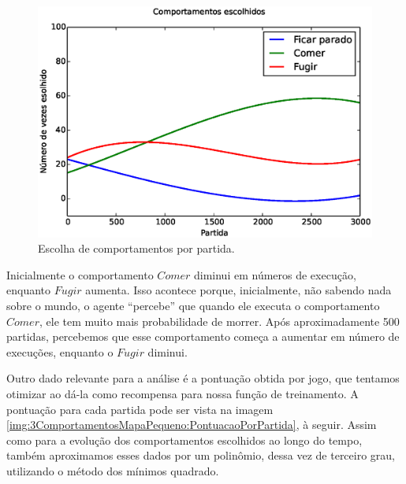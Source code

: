 \begin{figure}[H]
    \centering
    \includegraphics[width=\linewidth]{images/3_behaviors_small_map/chosen_behaviors_pol}
    \caption{Escolha de comportamentos por partida.}
    \label{img:3ComportamentosMapaPequeno:ComportamentosEscolhidosPolinômio}
\end{figure}

Inicialmente o comportamento $ Comer $ diminui em números de execução, enquanto $ Fugir $ aumenta. Isso acontece porque, inicialmente, não sabendo nada sobre o mundo, o agente ``percebe'' que quando ele executa o comportamento $ Comer $, ele tem muito mais probabilidade de morrer. Após aproximadamente 500 partidas, percebemos que esse comportamento começa a aumentar em número de execuções, enquanto o $ Fugir $ diminui.

Outro dado relevante para a análise é a pontuação obtida por jogo, que tentamos otimizar ao dá-la como recompensa para nossa função de treinamento. A pontuação para cada partida pode ser vista na imagem \ref{img:3ComportamentosMapaPequeno:PontuacaoPorPartida}, à seguir. Assim como para a evolução dos comportamentos escolhidos ao longo do tempo, também aproximamos esses dados por um polinômio, dessa vez de terceiro grau, utilizando o método dos mínimos quadrado.

